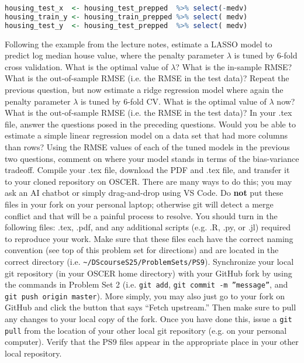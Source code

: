 \documentclass[12pt,english]{exam}
\begin{document}
\begin{questions}
\begin{lstlisting}[language=R]
housing_test_x  <- housing_test_prepped  %>% select(-medv)
housing_train_y <- housing_train_prepped %>% select( medv)
housing_test_y  <- housing_test_prepped  %>% select( medv)
\end{lstlisting}
\question Following the example from the lecture notes, estimate a LASSO model to predict log median house value, where the penalty parameter $\lambda$ is tuned by 6-fold cross validation. What is the optimal value of $\lambda$? What is the in-sample RMSE? What is the out-of-sample RMSE (i.e. the RMSE in the test data)?
\question Repeat the previous question, but now estimate a ridge regression model where again the penalty parameter $\lambda$ is tuned by 6-fold CV. What is the optimal value of $\lambda$ now? What is the out-of-sample RMSE (i.e. the RMSE in the test data)? 
\question In your .tex file, answer the questions posed in the preceding questions. Would you be able to estimate a simple linear regression model on a data set that had more columns than rows? Using the RMSE values of each of the tuned models in the previous two questions, comment on where your model stands in terms of the bias-variance tradeoff.
\question Compile your .tex file, download the PDF and .tex file, and transfer it to your cloned repository on OSCER. There are many ways to do this;  you may ask an AI chatbot or simply drag-and-drop using VS Code. Do \textbf{not} put these files in your fork on your personal laptop; otherwise git will detect a merge conflict and that will be a painful process to resolve.
\question You should turn in the following files: .tex, .pdf, and any additional scripts (e.g. .R, .py, or .jl) required to reproduce your work.  Make sure that these files each have the correct naming convention (see top of this problem set for directions) and are located in the correct directory (i.e. \texttt{\textasciitilde/DScourseS25/ProblemSets/PS9}).
\question Synchronize your local git repository (in your OSCER home directory) with your GitHub fork by using the commands in Problem Set 2 (i.e. \texttt{git add}, \texttt{git commit -m ''message''}, and \texttt{git push origin master}). More simply, you may also just go to your fork on GitHub and click the button that says ``Fetch upstream.'' Then make sure to pull any changes to your local copy of the fork. Once you have done this, issue a \texttt{git pull} from the location of your other local git repository (e.g. on your personal computer). Verify that the PS9 files appear in the appropriate place in your other local repository.
\end{questions}
\end{document}

